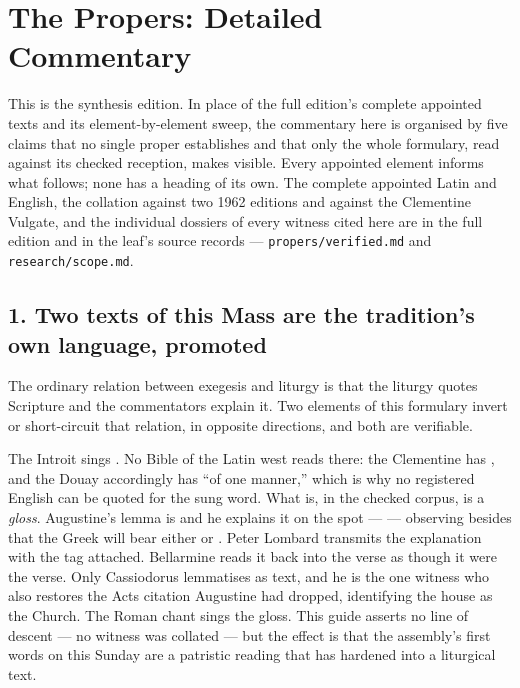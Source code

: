 \section*{The Propers: Detailed Commentary}

This is the synthesis edition. In place of the full edition's complete
appointed texts and its element-by-element sweep, the commentary here is
organised by five claims that no single proper establishes and that only the
whole formulary, read against its checked reception, makes visible. Every
appointed element informs what follows; none has a heading of its own. The
complete appointed Latin and English, the collation against two 1962 editions
and against the Clementine Vulgate, and the individual dossiers of every
witness cited here are in the full edition and in the leaf's source records ---
\texttt{propers/verified.md} and \texttt{research/scope.md}.

\subsection*{1. Two texts of this Mass are the tradition's own language, promoted}

The ordinary relation between exegesis and liturgy is that the liturgy quotes
Scripture and the commentators explain it. Two elements of this formulary
invert or short-circuit that relation, in opposite directions, and both are
verifiable.

The Introit sings . No Bible
of the Latin west reads  there: the Clementine has
, and the Douay accordingly has ``of one manner,'' which is
why no registered English can be quoted for the sung word. What
 is, in the checked corpus, is a \textit{gloss}. Augustine's
lemma is  and he explains it on the spot ---
 --- observing besides that the Greek will
bear either  or . Peter Lombard transmits the
explanation with the tag attached. Bellarmine reads it back into the verse as
though it were the verse. Only Cassiodorus lemmatises  as text,
and he is the one witness who also restores the Acts citation Augustine had
dropped, identifying the house as the Church. The Roman chant sings the gloss.
This guide asserts no line of descent --- no  witness
was collated --- but the effect is that the assembly's first words on this
Sunday are a patristic reading that has hardened into a liturgical text.

